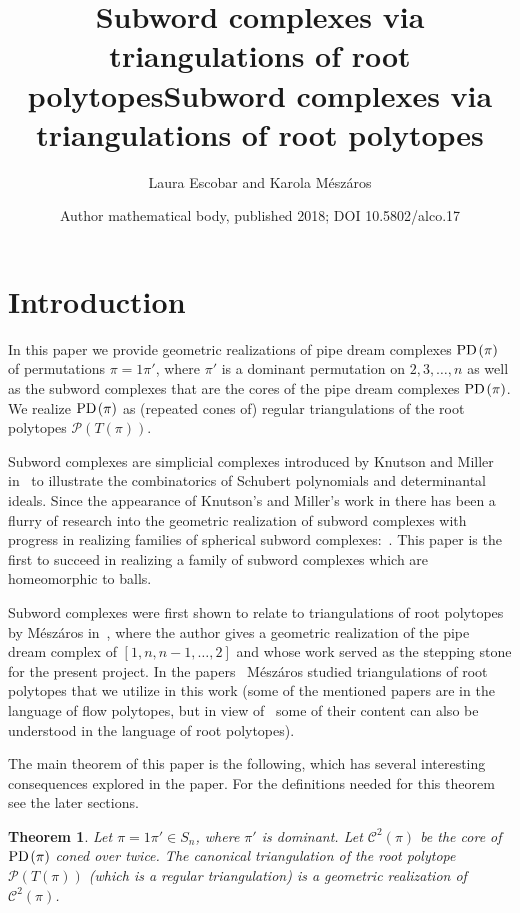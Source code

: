 \documentclass[10pt]{amsart}
\title {Subword complexes via triangulations of root polytopes}
\title{Subword complexes via triangulations of root polytopes}
\author{Laura Escobar and Karola Mészáros}
\date{Author mathematical body, published 2018; DOI 10.5802/alco.17}
\newtheorem{theo}{Theorem}[section]
\theoremstyle{definition}
\numberwithin{equation}{section}
\renewcommand*\P{{\mathcal{P}}}
\newcommand*\+{\smash{\lower2pt\hbox{\rlap{\vrule height14pt}}\raise2pt\hbox{\rlap{\hskip-3pt \vrule height.4pt depth0pt width14.7pt}}}}
\newcommand*{\MK}{\mkern 2mu}
\DeclareMathOperator{\PD}{\textit{PD}\MK}
\begin{document}
\maketitle
\section{Introduction}

In this paper we provide geometric realizations of pipe dream complexes $\PD(\pi)$ of permutations $\pi=1\pi'$, where $\pi'$ is a dominant permutation on $2,3,\dots, n$ as well as the subword complexes that are the cores of the pipe dream complexes $\PD(\pi)$. We realize $\PD(\pi)$ as (repeated cones of) regular triangulations of the root polytopes $\P(T(\pi))$.

Subword complexes are simplicial complexes introduced by Knutson and Miller in~\cite{subword,annals} to illustrate the combinatorics of Schubert polynomials and determinantal ideals. Since the appearance of Knutson's and Miller's work in there has been a flurry of research into the geometric realization of subword complexes with progress in realizing families of spherical subword complexes:~\cite{reviewedfansub,cesar,subwordcluster,escobar,assoc,abrick,SerranoStump,stump}. This paper is the first to succeed in realizing a family of subword complexes which are homeomorphic to balls.

Subword complexes were first shown to relate to triangulations of root polytopes by M{\'e}sz\'aros in~\cite{groth}, where the author gives a geometric realization of the pipe dream complex of $[1,n,n-1,\dots,2]$ and whose work served as the stepping stone for the present project. In the papers~\cite{root1, h-poly1, prod, h-poly2} M{\'e}sz\'aros studied triangulations of root polytopes that we utilize in this work (some of the mentioned papers are in the language of flow polytopes, but in view of~\cite[Section~4]{groth} some of their content can also be understood in the language of root polytopes).

The main theorem of this paper is the following, which has several interesting consequences explored in the paper. For the definitions needed for this theorem see the later sections.

\begin{theo}\label{thm:intro}
Let $\pi=1\pi' \in S_n$, where $\pi'$ is dominant. Let $\mathcal{C}^2(\pi)$ be the core of $\PD(\pi)$ coned over twice. The canonical triangulation of the root polytope $\P(T(\pi))$ (which is a regular triangulation) is a geometric realization of $\mathcal{C}^2(\pi)$.
\end{theo}
\end{document}
